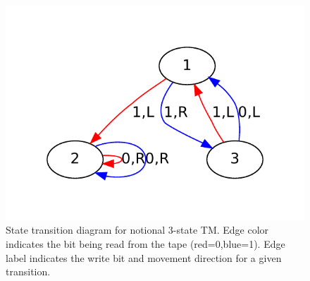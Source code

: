 \begin{figure}[!hbp]
	\centering 
	\includegraphics[width=.8\textwidth]{images/example_TM}
	\caption{State transition diagram for notional 3-state TM. Edge color indicates the bit being read from the tape (red=0,blue=1). Edge label indicates the write bit and movement direction for a given transition.}
	\label{fig:example_TM}
\end{figure}
